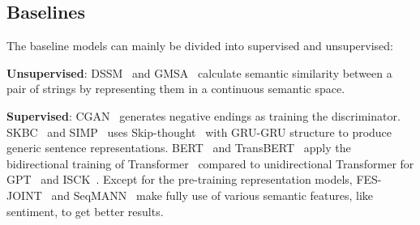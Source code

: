 \subsection{Baselines}
\label{sec:baselines}
The baseline models can mainly be divided into supervised and unsupervised: 

\textbf{Unsupervised}: DSSM~\cite{mostafazadeh2016corpus} and GMSA~\cite{guan2018story} 
calculate semantic similarity 
between a pair of strings by representing them in a continuous semantic space.

\textbf{Supervised}: CGAN~\cite{wang2017conditional} generates negative endings as training the 
discriminator. SKBC~\cite{roemmele2017rnn} and SIMP~\cite{srinivasan2018simple} 
uses Skip-thought~\cite{kiros2015skip}
with GRU-GRU
structure to produce generic sentence representations. 
BERT~\cite{devlin2018bert} and TransBERT~\cite{li2019story} 
apply the bidirectional training of Transformer~\cite{vaswani2017attention} 
compared to unidirectional Transformer for GPT~\cite{radford2018improving} 
and ISCK~\cite{chen2018incorporating}. Except for the pre-training representation 
models, FES-JOINT~\cite{peng2017joint} and SeqMANN~\cite{li2018multi} make
fully use of various semantic features, like sentiment, to get better results. 


